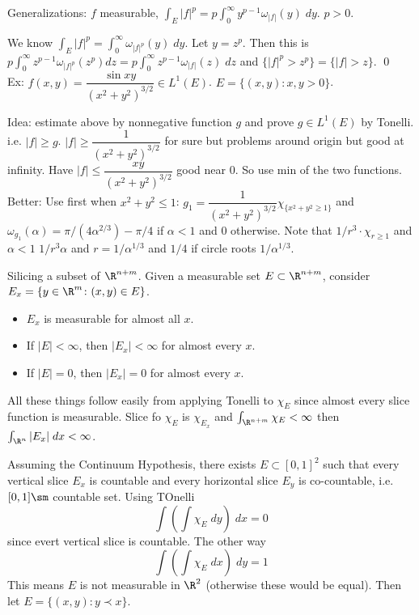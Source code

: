 Generalizations: $f$ measurable, $\int_E |f|^p= p \int_0^\infty y^{p-1} \omega_{|f|}(y) \; dy$. $p>0$.

We know $\int_E |f|^p= \int_0^\infty \omega_{|f|^p}(y) \; dy$. Let $y=z^p$. Then this is $p \int_0^\infty z^{p-1} \omega_{|f|^p}(z^p) dz= p \int_0^\infty z^{p-1} \omega_{|f|}(z)\;dz$ and $\{ |f|^p>z^p\}= \{|f|>z\}$. \qed \\




Ex: $f(x,y)=\dfrac{\sin xy}{(x^2+y^2)^{3/2}} \in L^1(E)$. $E= \{(x,y) \colon x,y>0\}$. 

Idea: estimate above by nonnegative function $g$ and prove $g \in L^1(E)$ by Tonelli. i.e. $|f| \geq g$. $|f| \geq \dfrac{1}{(x^2+y^2)^{3/2}}$ for sure but problems around origin but good at infinity. Have $|f| \leq \dfrac{xy}{(x^2+y^2)^{3/2}}$ good near 0. So use min of the two functions. Better: Use first when $x^2+y^2 \leq 1$: $g_1=\dfrac{1}{(x^2+y^2)^{3/2}} \chi_{\{x^2+y^2 \geq 1\}}$ and $\omega_{g_1}(\alpha)= \pi/(4\alpha^{2/3}) - \pi/4$ if $\alpha<1$ and 0 otherwise. Note that $1/r^3 \cdot \chi_{r \geq 1}$ and $\alpha<1$ $1/r^3\alpha$ and $r= 1/\alpha^{1/3}$ and $1/4$ if circle roots $1/\alpha^{1/3}$. 




Silicing a subset of $\R^{n+m}$. Given a measurable set $E \subset \R^{n+m}$, consider $E_x= \{ y \in \R^m \colon (x,y) \in E \}$. 


\begin{itemize}
\item $E_x$ is measurable for almost all $x$.
\item If $|E|<\infty$, then $|E_x|<\infty$ for almost every $x$.
\item If $|E|=0$, then $|E_x|=0$ for almost every $x$. 
\end{itemize}

All these things follow easily from applying Tonelli to $\chi_E$ since almost every slice function is measurable. Slice fo $\chi_E$ is $\chi_{E_x}$ and $\int_{\R^{n+m}} \chi_E< \infty$ then $\int_{\R^n} |E_x| \; dx <\infty$.


\begin{ex} %
Assuming the Continuum Hypothesis, there exists $E \subset [0,1]^2$ such that every vertical slice $E_x$ is countable and every horizontal slice $E_y$ is co-countable, i.e. $[0,1] \sm$ countable set. Using TOnelli
	\[
	\int( \int \chi_E \; dy ) \; dx = 0
	\]
since evert vertical slice is countable. The other way
	\[
	\int (\int \chi_E \; dx ) \; dy = 1
	\]
This means $E$ is not measurable in $\R^2$ (otherwise these would be equal). Then let $E= \{ (x,y) \colon y \prec x \}$.
\end{ex}




